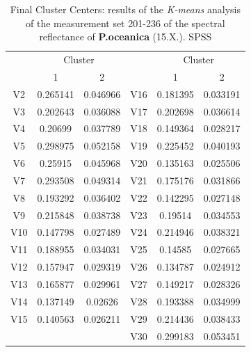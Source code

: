 \documentclass[10pt, a4paper]{article}
\begin{document}
\begin{appendices}
\begin{table}[htbp]
\caption{Final Cluster Centers: results of the \textit{K-means} analysis of the measurement set 201-236 of the spectral reflectance of \textbf{P.oceanica} (15.X.). SPSS}
\label{tab:16}
\begin{center}
\begin{tabular}{|c|c|c|c|c|c|}
\hline\hline
& \multicolumn{2}{|c|}{Cluster} &  & \multicolumn{2}{|c|}{Cluster}\\
 & 1 & 2 &  & 1 & 2 \\ \hline\hline
V2  &	0.265141 &	0.046966 &	V16 &	0.181395 &	0.033191 \\ \hline
V3 &	0.202643 &	0.036088 &	V17 &	0.202698 &	0.036614 \\ \hline
V4 &	0.20699 &	0.037789 &	V18 &	0.149364 &	0.028217 \\ \hline
V5 &	0.298975 &	0.052158 &	V19 &	0.225452 &	0.040193 \\ \hline
V6 &	0.25915 &	0.045968 &	V20 &	0.135163 &	0.025506 \\ \hline
V7 &	0.293508 &	0.049314 &	V21 &	0.175176 &	0.031866 \\ \hline
V8 &	0.193292 &	0.036402 &	V22 &	0.142295 &	0.027148 \\ \hline
V9 &	0.215848 &	0.038738 &	V23 &	0.19514 &	0.034553 \\ \hline
V10 &	0.147798 &	0.027489 &	V24 &	0.214946 &	0.038321 \\ \hline
V11 &	0.188955 &	0.034031 &	V25 &	0.14585 &	0.027665 \\ \hline
V12 &	0.157947 &	0.029319 &	V26 &	0.134787 &	0.024912 \\ \hline
V13 &	0.165877 &	0.029961 &	V27 &	0.149217 &	0.028326 \\ \hline
V14 &	0.137149 &	0.02626 &	V28 &	0.193388 &	0.034999 \\ \hline
V15 &	0.140563 &	0.026211 &	V29 &	0.214436 &	0.038433 \\ \hline
 &	 &	 &	V30	 & 0.299183	 & 0.053451 \\ \hline
\end{tabular}
\end{center}
\label{fig:5}
\end{table}



\end{appendices}
\end{document}
